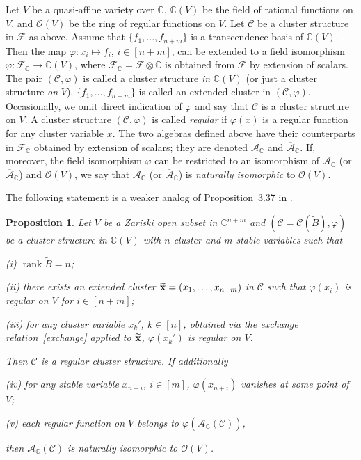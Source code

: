 \documentclass{amsart}
\newtheorem{proposition}[theorem]{Proposition}
\theoremstyle{definition}
\theoremstyle{remark}
\numberwithin{equation}{section}
\numberwithin{theorem}{section}
\begin{document}
Let $V$ be a quasi-affine variety over ${{\mathbb C}}$, ${{\mathbb C}}(V)$ be the field of rational functions on $V$, and
${{\mathcal O}}(V)$ be the ring of regular functions on $V$. Let ${{\mathcal C}}$ be a cluster structure in ${{\mathcal F}}$ as above.
Assume that $\{f_1,\dots,f_{n+m}\}$ is a transcendence basis of ${{\mathbb C}}(V)$. Then the map $\varphi: x_i\mapsto f_i$,
$i\in [n+m]$, can be extended to a field isomorphism $\varphi: {{\mathcal F}}_{{\mathbb C}}\to {{\mathbb C}}(V)$,  
where ${{\mathcal F}}_{{\mathbb C}}={{\mathcal F}}\otimes{{\mathbb C}}$ is obtained from ${{\mathcal F}}$ by extension of scalars.
The pair $({{\mathcal C}},\varphi)$ is called a cluster structure {\it in\/}
${{\mathbb C}}(V)$ (or just a cluster structure {\it on\/} $V$), $\{f_1,\dots,f_{n+m}\}$ is called an extended cluster in
 $({{\mathcal C}},\varphi)$.
Occasionally, we omit direct indication of $\varphi$ and say that ${{\mathcal C}}$ is a cluster structure on $V$. 
A cluster structure $({{\mathcal C}},\varphi)$ is called {\it regular\/}
if $\varphi(x)$ is a regular function for any cluster variable $x$. 
The two algebras defined above have their counterparts in ${{\mathcal F}}_{{\mathbb C}}$ obtained by extension of scalars; they are
denoted ${{\mathcal A}}_{{\mathbb C}}$ and ${\overline{{\mathcal A}}}_{{\mathbb C}}$.
If, moreover, the field isomorphism $\varphi$ can be restricted to an isomorphism of 
${{\mathcal A}}_{{\mathbb C}}$ (or ${\overline{{\mathcal A}}}_{{\mathbb C}}$) and ${{\mathcal O}}(V)$, we say that 
${{\mathcal A}}_{{\mathbb C}}$ (or ${\overline{{\mathcal A}}}_{{\mathbb C}}$) is {\it naturally isomorphic\/} to ${{\mathcal O}}(V)$.

The following statement is a weaker analog of Proposition~3.37 in \cite{GSVb}.

\begin{proposition}\label{regfun}
Let $V$ be a Zariski open subset in ${{\mathbb C}}^{n+m}$ and $({{\mathcal C}}={{\mathcal C}}({{\widetilde{B}}}),\varphi)$ be a cluster structure in ${{\mathbb C}}(V)$  
with $n$ cluster and $m$ stable variables such that

{\rm(i)} ${\operatorname{rank}}{{\widetilde{B}}}=n$;

{\rm(ii)} there exists an extended cluster ${{\widetilde{\bf x}}}=(x_1,\dots,x_{n+m})$ in ${{\mathcal C}}$ such that $\varphi(x_i)$ is
regular on $V$ for $i\in [n+m]$;

{\rm(iii)} for any cluster variable $x_k'$, $k\in [n]$, obtained via the exchange relation~\eqref{exchange} 
applied to ${{\widetilde{\bf x}}}$, $\varphi(x_k')$ is regular on $V$.

\noindent Then ${{\mathcal C}}$ is a regular cluster structure. If additionally

{\rm(iv)} for any stable variable $x_{n+i}$, $i\in [m]$, $\varphi(x_{n+i})$ vanishes at some point of $V$;

{\rm(v)} each regular function on $V$ belongs to $\varphi({\overline{{\mathcal A}}}_{{\mathbb C}}({{\mathcal C}}))$,

\noindent then ${\overline{{\mathcal A}}}_{{\mathbb C}}({{\mathcal C}})$ is naturally isomorphic to ${{\mathcal O}}(V)$.
\end{proposition}
\end{document}
